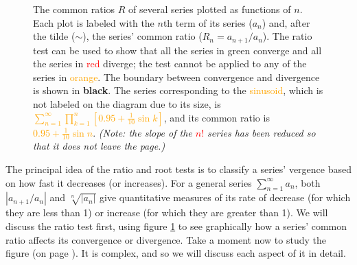 \documentclass{myarticle}
\theoremstyle{nospace}
\newtheorem{old series theorem}{Theorem}
\newenvironment{series theorem}
{\begin{mdframed}\begin{old series theorem}}
    {\end{old series theorem}\end{mdframed}}
\begin{document}
\begin{figure}[htbp]
  \caption{The common ratios $R$ of several series plotted as
    functions of $n$. Each plot is labeled with the $n$th term of its
    series ($a_n$) and, after the tilde ($\sim$), the series' common
    ratio ($R_n = a_{n+1}/a_n$). The ratio test can be used to show
    that all the series in \textcolor{black!30!green}{green} converge
    and all the series in \textcolor{red}{red} diverge; the test
    cannot be applied to any of the series in
    \textcolor{orange}{orange}. The boundary between convergence and
    divergence is shown in \textbf{black}. The series corresponding to
    the \textcolor{orange}{sinusoid}, which is not labeled on the
    diagram due to its size, is
    \textcolor{orange}{$\sum_{n=1}^\infty \prod_{k=1}^n [0.95 +
      \frac{1}{10} \sin k]$}, and its common ratio is
    \textcolor{orange}{$0.95 + \frac{1}{10} \sin n$}. \emph{(Note: the
      slope of the \textcolor{red}{$n!$} series has been reduced so
      that it does not leave the page.)}}
  \label{fig:ratio test}
\end{figure}

The principal idea of the ratio and root tests is to classify a
series' vergence based on how fast it decreases (or increases). For a
general series $\sum_{n=1}^\infty a_n$, both $|a_{n+1}/a_n|$ and
$\sqrt[n]{|a_n|}$ give quantitative measures of its rate of decrease
(for which they are less than 1) or increase (for which they are
greater than 1). We will discuss the ratio test first, using figure
\ref{fig:ratio test} to see graphically how a series' common ratio
affects its convergence or divergence. Take a moment now to study the
figure (on page \pageref{fig:ratio test}). It is complex, and so we
will discuss each aspect of it in detail.
\end{document}
